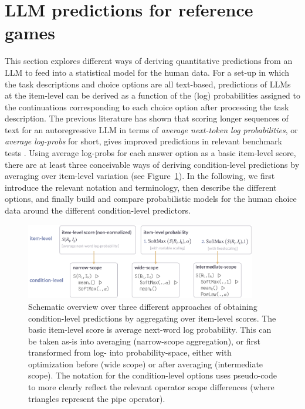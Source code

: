 \documentclass{article}
\begin{document}
\section{LLM predictions for reference games}
\label{llm-predictions-for-reference-games}

This section explores different ways of deriving quantitative predictions from an LLM to feed into a statistical model for the human data.
For a set-up in which the task descriptions and choice options are all text-based, predictions of LLMs at the item-level can be derived as a function of the (log) probabilities assigned to the continuations corresponding to each choice option after processing the task description.
The previous literature has shown that scoring longer sequences of text for an autoregressive LLM in terms of \emph{average next-token log probabilities}, or \emph{average log-probs} for short, gives improved predictions in relevant benchmark tests \citep[e.g.,][]{BrownMann2020:Language-Models}.
Using average log-probs for each answer option as a basic item-level score, there are at least three conceivable ways of deriving condition-level predictions by averaging over item-level variation (see Figure~\ref{fig:measures-overview}).
In the following, we first introduce the relevant notation and terminology, then describe the different options, and finally build and compare probabilistic models for the human choice data around the different condition-level predictors.

\begin{figure}
  \centering
  \includegraphics[width=0.9\textwidth]{00-pics/measures-overview.png}
  \caption{Schematic overview over three different approaches of obtaining condition-level predictions by aggregating over item-level scores. The basic item-level score is average next-word log probability. This can be taken as-is into averaging (narrow-scope aggregation), or first transformed from log- into probability-space, either with optimization before (wide scope) or after averaging (intermediate scope).
  The notation for the condition-level options uses pseudo-code to more clearly reflect the relevant operator scope differences (where triangles represent the pipe operator).}
  \label{fig:measures-overview}
\end{figure}
\end{document}

